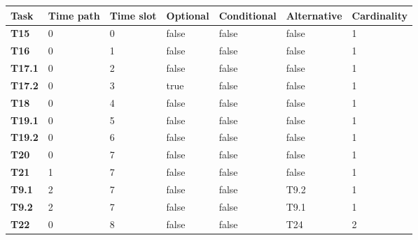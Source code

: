 \begin{table}[h]
{\renewcommand{\arraystretch}{1.5}
\begin{tabularx}{\textwidth}{@{}lllllll@{}}
\toprule
\textbf{Task}  & \textbf{Time path} & \textbf{Time slot} & \textbf{Optional} & \textbf{Conditional} & \textbf{Alternative} & Cardinality \\ \midrule
\textbf{T15}   & 0                  & 0                  & false             & false                & false                & 1           \\
\textbf{T16}   & 0                  & 1                  & false             & false                & false                & 1           \\
\textbf{T17.1} & 0                  & 2                  & false             & false                & false                & 1           \\
\textbf{T17.2} & 0                  & 3                  & true              & false                & false                & 1           \\
\textbf{T18}   & 0                  & 4                  & false             & false                & false                & 1           \\
\textbf{T19.1} & 0                  & 5                  & false             & false                & false                & 1           \\
\textbf{T19.2} & 0                  & 6                  & false             & false                & false                & 1           \\
\textbf{T20}   & 0                  & 7                  & false             & false                & false                & 1           \\
\textbf{T21}   & 1                  & 7                  & false             & false                & false                & 1           \\
\textbf{T9.1}  & 2                  & 7                  & false             & false                & T9.2                 & 1           \\
\textbf{T9.2}  & 2                  & 7                  & false             & false                & T9.1                 & 1           \\
\textbf{T22}   & 0                  & 8                  & false             & false                & T24                  & 2           \\

\end{tabularx}}
\end{table}
